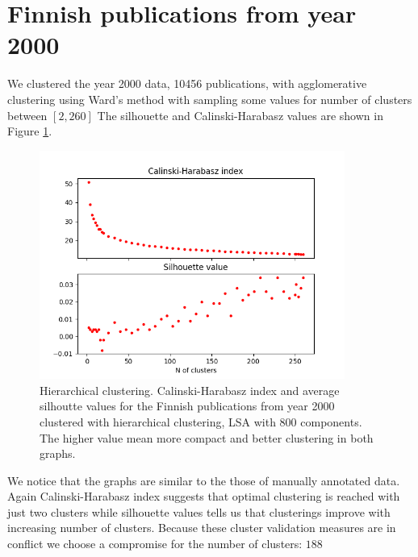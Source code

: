 \section{Finnish publications from year 2000}
We clustered the year 2000 data, 10456 publications, with 
agglomerative clustering using Ward's method with sampling some 
values for number of clusters between $[2,260]$ 
The silhouette and Calinski-Harabasz values are shown in Figure 
\ref{fig:ch-silh-2000-h}.
\begin{figure}[htp]
  \begin{center}    
\includegraphics[width=10cm]{images/c-h-silh-index-plot-y2000-2_260-800-hierarchical.png}
    \caption{Hierarchical clustering. Calinski-Harabasz index and 
    average silhoutte values for the Finnish publications from year 2000 
    clustered with hierarchical clustering, LSA with 800 components. 
    The higher value mean more compact and better clustering in both graphs.}
    \label{fig:ch-silh-2000-h}
  \end{center}
\end{figure}
We notice that the graphs are similar to the those of manually
annotated data. Again Calinski-Harabasz index suggests that 
optimal clustering is reached with just two clusters while 
silhouette values tells us that clusterings improve with increasing
number of clusters. Because these cluster validation measures are
in conflict we choose a compromise for the number of clusters: $188$

